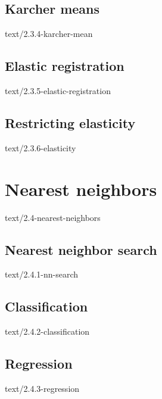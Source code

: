 \documentclass[epsbased,copyleft,final,extendedindex,firstnumbered,tfg, english]{tfgtfmthesisuam}
\begin{document}
      \subsection{Karcher means\label{SEC:KARCHER}}{text/2.3.4-karcher-mean}
      \subsection{Elastic registration\label{SEC:ELASTICREG}}{text/2.3.5-elastic-registration}
      \subsection{Restricting elasticity\label{SEC:RESTRICT}}{text/2.3.6-elasticity}

    \section{Nearest neighbors\label{SEC:NEIGHBORS}}{text/2.4-nearest-neighbors}
    \subsection{Nearest neighbor search\label{SEC:SEARCH}}{text/2.4.1-nn-search}
    \subsection{Classification\label{SEC:SEARCH}}{text/2.4.2-classification}
    \subsection{Regression\label{SEC:SEARCH}}{text/2.4.3-regression}
\end{document}
